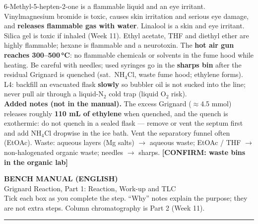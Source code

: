 \documentclass[10pt,a4paper]{article}
\newcommand{\pagetitle}[3]{%
  \begin{center}
  {\Large\bfseries #1}\\[3pt]
  {\large #2}\\[4pt]
  {\footnotesize #3}
  \end{center}\vspace{-4pt}\noindent\rule{\textwidth}{0.8pt}\vspace{4pt}}
\newcommand{\confirm}[1]{\textbf{[CONFIRM: #1]}}
\begin{document}
\medskip
\begin{tcolorbox}[safety,title={SAFETY --- from the manual (pp.\ 20--23) and L4}]
\footnotesize
6-Methyl-5-hepten-2-one is a flammable liquid and an eye irritant. Vinylmagnesium bromide is toxic, causes skin irritation and serious eye damage, and \textbf{releases flammable gas with water}. Linalool is a skin and eye irritant. Silica gel is toxic if inhaled (Week 11). Ethyl acetate, THF and diethyl ether are highly flammable; hexane is flammable and a neurotoxin. The \textbf{hot air gun reaches 300--500\,°C}: no flammable chemicals or solvents in the fume hood while heating. Be careful with needles; used syringes go in the \textbf{sharps bin} after the residual Grignard is quenched (sat.\ NH$_4$Cl, waste fume hood; ethylene forms). L4: backfill an evacuated flask \textbf{slowly} so bubbler oil is not sucked into the line; never pull air through a liquid-N$_2$ cold trap (liquid O$_2$ risk).\\
\textbf{Added notes (not in the manual).} The excess Grignard ($\approx$4.5 mmol) releases roughly \textbf{110 mL of ethylene} when quenched, and the quench is exothermic: do not quench in a sealed flask --- remove or vent the septum first and add NH$_4$Cl dropwise in the ice bath. Vent the separatory funnel often (EtOAc). Waste: aqueous layers (Mg salts) $\to$ aqueous waste; EtOAc / THF $\to$ non-halogenated organic waste; needles $\to$ sharps. \confirm{waste bins in the organic lab}
\end{tcolorbox}

\newpage
\begingroup\linespread{1.0}\selectfont
\pagetitle{BENCH MANUAL (ENGLISH)}{Grignard Reaction, Part 1: Reaction, Work-up and TLC}
{Tick each box as you complete the step. ``Why'' notes explain the purpose; they are not extra steps. Column chromatography is Part 2 (Week 11).}
\end{document}
